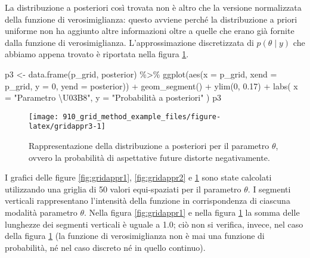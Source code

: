 \documentclass[
]{memoir}
\newenvironment{Shaded}{\begin{snugshade}}{\end{snugshade}}
\newcommand{\AttributeTok}[1]{\textcolor[rgb]{0.77,0.63,0.00}{#1}}
\newcommand{\DecValTok}[1]{\textcolor[rgb]{0.00,0.00,0.81}{#1}}
\newcommand{\FloatTok}[1]{\textcolor[rgb]{0.00,0.00,0.81}{#1}}
\newcommand{\FunctionTok}[1]{\textcolor[rgb]{0.00,0.00,0.00}{#1}}
\newcommand{\NormalTok}[1]{#1}
\newcommand{\OtherTok}[1]{\textcolor[rgb]{0.56,0.35,0.01}{#1}}
\newcommand{\SpecialCharTok}[1]{\textcolor[rgb]{0.00,0.00,0.00}{#1}}
\newcommand{\StringTok}[1]{\textcolor[rgb]{0.31,0.60,0.02}{#1}}
\begin{document}
La distribuzione a posteriori così trovata non è altro che la versione normalizzata della funzione di verosimiglianza: questo avviene perché la distribuzione a priori uniforme non ha aggiunto altre informazioni oltre a quelle che erano già fornite dalla funzione di verosimiglianza. L'approssimazione discretizzata di \(p(\theta \mid y)\) che abbiamo appena trovato è riportata nella figura \ref{fig:gridappr3}.

\begin{Shaded}
\begin{Highlighting}[]
\NormalTok{p3 }\OtherTok{\textless{}{-}} \FunctionTok{data.frame}\NormalTok{(p\_grid, posterior) }\SpecialCharTok{\%\textgreater{}\%}
  \FunctionTok{ggplot}\NormalTok{(}\FunctionTok{aes}\NormalTok{(}\AttributeTok{x =}\NormalTok{ p\_grid, }\AttributeTok{xend =}\NormalTok{ p\_grid, }\AttributeTok{y =} \DecValTok{0}\NormalTok{, }\AttributeTok{yend =}\NormalTok{ posterior)) }\SpecialCharTok{+}
  \FunctionTok{geom\_segment}\NormalTok{() }\SpecialCharTok{+}
  \FunctionTok{ylim}\NormalTok{(}\DecValTok{0}\NormalTok{, }\FloatTok{0.17}\NormalTok{) }\SpecialCharTok{+}
  \FunctionTok{labs}\NormalTok{(}
    \AttributeTok{x =} \StringTok{"Parametro \textbackslash{}U03B8"}\NormalTok{,}
    \AttributeTok{y =} \StringTok{"Probabilità a posteriori"}
\NormalTok{  )}
\NormalTok{p3}
\end{Highlighting}
\end{Shaded}

\begin{figure}

{\centering \texttt{[image: 910\_grid\_method\_example\_files/figure-latex/gridappr3-1]} 

}

\caption{Rappresentazione della distribuzione a posteriori per il parametro $\theta$, ovvero la probabilità di aspettative future distorte negativamente.}\label{fig:gridappr3}
\end{figure}

I grafici delle figure \ref{fig:gridappr1}, \ref{fig:gridappr2} e \ref{fig:gridappr3} sono state calcolati utilizzando una griglia di 50 valori equi-spaziati per il parametro \(\theta\). I segmenti verticali rappresentano l'intensità della funzione in corrispondenza di ciascuna modalità parametro \(\theta\). Nella figura \ref{fig:gridappr1} e nella figura \ref{fig:gridappr3} la somma delle lunghezze dei segmenti verticali è uguale a 1.0; ciò non si verifica, invece, nel caso della figura \ref{fig:gridappr3} (la funzione di verosimiglianza non è mai una funzione di probabilità, né nel caso discreto né in quello continuo).
\end{document}
